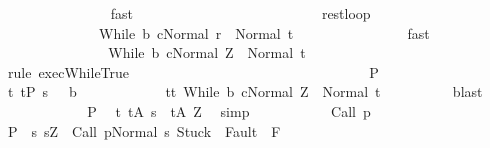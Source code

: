 \begin{isabellebody}
\ \ \ \ \ \ \ \ \ \ \ \ \ \ \isamarkupfalse%
\ fast\isanewline
\ \ \ \ \ \ \ \ \ \ \ \ \isamarkupfalse%
\isanewline
\ \ \ \ \ \ \ \ \ \ \ \ \isamarkupfalse%
\ rest{\isacharunderscore}loop\ \isamarkupfalse%
\isanewline
\ \ \ \ \ \ \ \ \ \ \ \ \ \ {\isachardoublequoteopen}{\isasymGamma}{\isasymturnstile}{\isasymlangle}While\ b\ c{\isacharcomma}Normal\ r{\isasymrangle}\ {\isasymRightarrow}\ Normal\ t{\isachardoublequoteclose}\isanewline
\ \ \ \ \ \ \ \ \ \ \ \ \ \ \isamarkupfalse%
\ fast\isanewline
\ \ \ \ \ \ \ \ \ \ \ \ \isamarkupfalse%
\ \isamarkupfalse%
\ {\isachardoublequoteopen}{\isasymGamma}{\isasymturnstile}{\isasymlangle}While\ b\ c{\isacharcomma}Normal\ Z{\isasymrangle}\ {\isasymRightarrow}\ Normal\ t{\isachardoublequoteclose}\isanewline
\ \ \ \ \ \ \ \ \ \ \ \ \ \ \isamarkupfalse%
\ {\isacharparenleft}rule\ exec{\isachardot}WhileTrue{\isacharparenright}\isanewline
\ \ \ \ \ \ \ \ \ \ \isamarkupfalse%
\isanewline
\ \ \ \ \ \ \ \ \isamarkupfalse%
\isanewline
\ \ \ \ \ \ \isacommand{{\isacharbraceright}}\isamarkupfalse%
\isanewline
\ \ \ \ \ \ \isamarkupfalse%
\ P\isanewline
\ \ \ \ \ \ \isamarkupfalse%
\ {\isachardoublequoteopen}{\isacharparenleft}{\isasymforall}t{\isachardot}\ t{\isasymin}{\isacharparenleft}{\isacharquery}P{\isacharprime}\ s\ {\isasyminter}\ {\isacharminus}\ b{\isacharparenright}\isanewline
\ \ \ \ \ \ \ \ \ \ \ \ {\isasymlongrightarrow}t{\isasymin}{\isacharbraceleft}t{\isachardot}\ {\isasymGamma}{\isasymturnstile}{\isasymlangle}While\ b\ c{\isacharcomma}Normal\ Z{\isasymrangle}\ {\isasymRightarrow}\ Normal\ t{\isacharbraceright}{\isacharparenright}{\isachardoublequoteclose}\isanewline
\ \ \ \ \ \ \ \ \isamarkupfalse%
\ blast\isanewline
\ \ \ \ \isamarkupfalse%
\isanewline
\ \ \ \ \ \ \isamarkupfalse%
\ P\ \isamarkupfalse%
\ {\isachardoublequoteopen}{\isasymforall}t{\isachardot}\ t{\isasymin}{\isacharquery}A{\isacharprime}\ s\ {\isasymlongrightarrow}\ t{\isasymin}{\isacharquery}A{\isacharprime}\ Z{\isachardoublequoteclose}\ \isamarkupfalse%
\ simp\isanewline
\ \ \ \ \isamarkupfalse%
\isanewline
\ \ \isamarkupfalse%
\isanewline
{}\isamarkupfalse%
\isanewline
\ \ \isamarkupfalse%
\ {\isacharparenleft}Call\ p{\isacharparenright}\isanewline
\ \ \isamarkupfalse%
\ {\isacharquery}P\ {\isacharequal}\ {\isachardoublequoteopen}{\isacharbraceleft}s{\isachardot}\ s{\isacharequal}Z\ {\isasymand}\ {\isasymGamma}{\isasymturnstile}{\isasymlangle}Call\ p{\isacharcomma}Normal\ s{\isasymrangle}\ {\isasymRightarrow}{\isasymnotin}{\isacharparenleft}{\isacharbraceleft}Stuck{\isacharbraceright}\ {\isasymunion}\ Fault\ {\isacharbackquote}\ {\isacharparenleft}{\isacharminus}F{\isacharparenright}{\isacharparenright}{\isacharbraceright}{\isachardoublequoteclose}\isanewline

\end{isabellebody}
